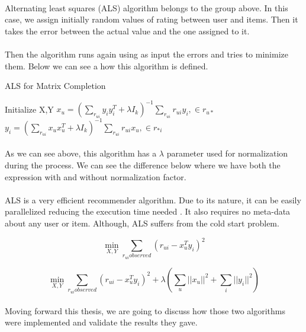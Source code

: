 \paragraph{} Alternating least squares (ALS) algorithm belongs to the group above. In this case, we assign initially random values of rating between user and items. Then it takes the error between the actual value and the one assigned to it. 

\paragraph{}Then the algorithm runs again using as input the errors and tries to minimize them. Below we can see a how this algorithm is defined. \\

\begin{algorithm}
	\caption{ALS for Matrix Completion}\label{ALS}
	\begin{algorithmic}[1]
		\State Initialize X,Y
		\Repeat
		\State $x_{u} = (\sum_{r_{ui}}y_{i}y_{i}^{T} + \lambda I_k)^{-1} \sum_{r_{ui}}r_{ui}y_{i} ,\in r_{u*}$
		\EndFor
		\State $y_{i} = (\sum_{r_{ui}}x_{u}x_{u}^{T} + \lambda I_k)^{-1} \sum_{r_{ui}}r_{ui}x_{u} ,\in r_{*i}$
		\EndFor
	\end{algorithmic}
\end{algorithm}

\paragraph{}As we can see above, this algorithm has a $\lambda$ parameter used for normalization during the process. We can see the difference below where we have both the expression with and without normalization factor.

\paragraph{} ALS is a very efficient recommender algorithm. Due to its nature, it can be easily parallelized reducing the execution time needed \cite{DistributedAlgorithmsAndOptimization:4}. It also requires no meta-data about any user or item. Although, ALS suffers from the cold start problem.

\begin{equation}
	\min_{X,Y} \sum_{r_{ui}observed}(r_{ui}-x_{u}^{T}y_{i})^{2}
\end{equation}

\begin{equation}
	\min_{X,Y} \sum_{r_{ui}observed}(r_{ui}-x_{u}^{T}y_{i})^{2} + \lambda(\sum_{u}||x_{u}||^2 + \sum_{i}||y_{i}||^2)
\end{equation}

\paragraph{} Moving forward this thesis, we are going to discuss how those two algorithms were implemented and validate the results they gave.